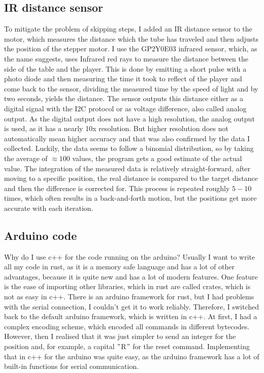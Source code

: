 \subsection{IR distance sensor}\label{subsec:ir-distance-sensor}
To mitigate the problem of skipping steps, I added an IR distance sensor to the motor, which measures the distance which the tube has traveled and then adjusts the position of the stepper motor.
I use the GP2Y0E03\autocite{ir-sensor} infrared sensor, which, as the name suggests, uses Infrared red rays to measure the distance between the side of the table and the player.
This is done by emitting a short pulse with a photo diode and then measuring the time it took to reflect of the player and come back to the sensor, dividing the measured time by the speed of light and by two seconds, yields the distance.
The sensor outputs this distance either as a digital signal with the I2C protocol or as voltage difference, also called analog output.
As the digital output does not have a high resolution, the analog output is used, as it has a nearly 10x resolution.
But higher resolution does not automatically mean higher accuracy and that was also confirmed by the data I collected.
Luckily, the data seems to follow a binomial distribution, so by taking the average of $\approx100$ values, the program gets a good estimate of the actual value.
The integration of the measured data is relatively straight-forward, after moving to a specific position, the real distance is compared to the target distance and then the difference is corrected for.
This process is repeated roughly $5-10$ times, which often results in a back-and-forth motion, but the positions get more accurate with each iteration.

\subsection{Arduino code}\label{subsec:arduino-code}
Why do I use c++ for the code running on the arduino?
Usually I want to write all my code in rust, as it is a memory safe language and has a lot of other advantages, because it is quite new and has a lot of modern features.
One feature is the ease of importing other libraries, which in rust are called crates, which is not as easy in c++.
There is an arduino framework for rust, but I had problems with the serial connection, I couldn't get it to work reliably.
Therefore, I switched back to the default arduino framework, which is written in c++.
At first, I had a complex encoding scheme, which encoded all commands in different bytecodes.
However, then I realised that it was just simpler to send an integer for the position and, for example, a capital \("\)R\("\) for the reset command.
Implementing that in c++ for the arduino was quite easy, as the arduino framework has a lot of built-in functions for serial communication.